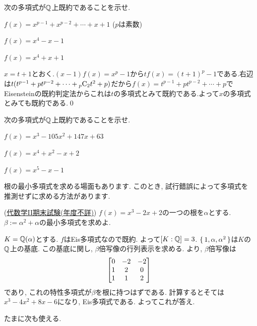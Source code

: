 \begin{egprob}
次の多項式が$\mathbb{Q}$上既約であることを示せ.
\ben
\item $f(x) = x^{p-1} + x^{p-2} + \cdots + x + 1$ ($p$は素数)
\item $f(x) = x^4 - x - 1$
\item $f(x) = x^4 + x + 1$
\een
\end{egprob}
\begin{egprob}
$x=t+1$とおく.$(x-1)f(x) = x^{p} - 1$から$tf(x) = (t+1)^{p} - 1$である.右辺は$t(t^{p-1} + pt^{p-2} + \cdots + {}_{p}\mathrm{C}_{2} t^2 + p)$だから$f(x) = t^{p-1} + p t^{p-2} + \cdots + p$でEisensteinの既約判定法からこれは$t$の多項式とみて既約である.よって$x$の多項式とみても既約である.\qed
\end{egprob}

\begin{prob}
次の多項式が$\mathbb{Q}$上既約であることを示せ.
\ben
\item $f(x) = x^3 - 105x^2 + 147x + 63 $
\item $f(x) = x^4 + x^2 - x  + 2$
\item $f(x) = x^5 - x - 1$
\een
\end{prob}
\begin{prob}
\end{prob}


根の最小多項式を求める場面もあります. このとき, 試行錯誤によって多項式を推測せずに求める方法があります.
\begin{egprob} (\href{https://www.math.kyoto-u.ac.jp/~yukie/Alg-II-final.pdf}{代数学II期末試験(年度不詳)})
$f(x) = x^3 - 2x + 2$の一つの根を$\alpha$とする. $\beta:= \alpha^2 + \alpha$の最小多項式を求めよ.
\end{egprob}
\begin{egans} $K=\mathbb{Q}(\alpha)$とする. $f$はEis多項式なので既約. よって$[K:\mathbb{Q}] = 3$. $\set{1,\alpha,\alpha^2}$は$K$の$\mathbb{Q}$上の基底. この基底に関し, $\beta$倍写像の行列表示を求める.
より, $\beta$倍写像は
\[
\begin{bmatrix}
0&-2&-2 \\
1&2&0\\
1&1&2
\end{bmatrix}
\]
であり, これの特性多項式が$\beta$を根に持つはずである. 計算するとそては$x^3 - 4x^2 + 8x - 6$になり, Eis多項式である. よってこれが答え.
\end{egans}

たまに次も使える.


